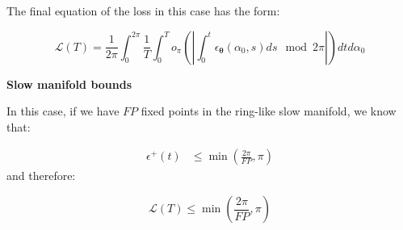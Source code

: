 \documentclass{article} %
\newcounter{ct}
\theoremstyle{definition}
\theoremstyle{remark}
\begin{document}
The final equation of the loss in this case has the form:

\begin{equation}
    \mathcal{L}(T) =  \frac{1}{2 \pi} \int_0^{2 \pi} \frac{1}{T} \int_0^T o_\pi \left( \left| \int_0^t \epsilon_{\bm{\theta}}(\alpha_0, s) ds \mod 2 \pi \right| \right) dt d\alpha_0
\end{equation}

\textbf{Slow manifold bounds}

In this case, if we have $FP$ fixed points in the ring-like slow manifold, we know that: 

\begin{equation}
\begin{split}
     \epsilon^+(t) &\leq \min \left( \frac{2 \pi}{FP}, \pi \right) 
\end{split}
\end{equation}
and therefore:

\begin{equation}
    \mathcal{L}(T) \leq \min \left( \frac{2 \pi}{FP}, \pi \right) 
\end{equation}




%
%
%
%
\end{document}
